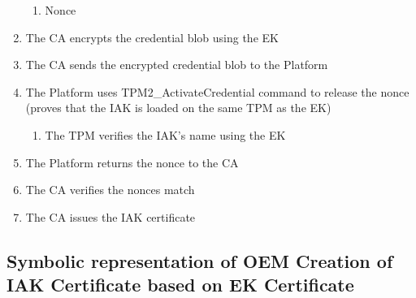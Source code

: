 \documentclass{article}
\begin{document}
\begin{enumerate}
\begin{enumerate}
        \item Nonce
    \end{enumerate}
    \item The CA encrypts the credential blob using the EK
    \item The CA sends the encrypted credential blob to the Platform
    \item The Platform uses TPM2\_ActivateCredential command to release the nonce (proves that the IAK is loaded on the same TPM as the EK)
    \begin{enumerate}
        \item The TPM verifies the IAK's name using the EK
    \end{enumerate}
    \item The Platform returns the nonce to the CA
    \item The CA verifies the nonces match
    \item The CA issues the IAK certificate
\end{enumerate}

\subsection*{Symbolic representation of OEM Creation of IAK Certificate based on EK Certificate}
\end{document}
